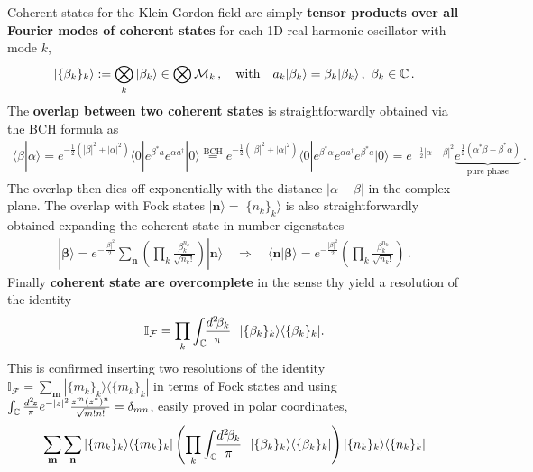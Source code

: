 \documentclass[../QFT_main.tex]{subfiles}
\begin{document}
\begin{mytheorem}
%
Coherent states for the Klein-Gordon field are simply \textbf{tensor products over all Fourier modes of coherent states} for each 1D real harmonic oscillator with mode $k$,
\begin{align}
    |\{ \beta_k \}_k \rangle := \bigotimes_{k} |\beta_k \rangle\in \bigotimes \mathcal{M}_k\,,\quad\text{with}\quad
    a_k |\beta_k \rangle = \beta_k |\beta_k \rangle\,,\,\, \beta_k\in \mathbb{C}\,.
\end{align}
The \textbf{overlap between two coherent states} is straightforwardly obtained via the BCH formula as
\begin{align}
    \langle \beta | \alpha \rangle = e^{-\frac{1}{2}(|\beta|^2 + |\alpha|^2)} \langle 0 | e^{\beta^* a} e^{\alpha a^{\dagger}} |0 \rangle \overset{\mathrm{BCH}}{=} e^{-\frac{1}{2}(|\beta|^2 + |\alpha|^2)} \langle 0 | e^{\beta^*\alpha}e^{\alpha a^\dagger} e^{\beta^* a} |0 \rangle 
    = e^{-\frac{1}{2}|\alpha-\beta|^2} \underbrace{e^{\frac{1}{2}(\alpha^*\beta-\beta^*\alpha)}}_{\text{pure phase}}\,.
\end{align}
The overlap then {dies off exponentially with the distance} $|\alpha-\beta|$ in the complex plane.
The overlap with Fock states $|\mathbf{n}\rangle = |\{n_k\}_k\rangle$ is also straightforwardly obtained expanding the coherent state in number eigenstates
\begin{align}
    |\boldsymbol{\beta} \rangle = e^{-\frac{|\beta|^2}{2}} \sum_{\mathbf{n}} \left(\prod_k\frac{\beta_k^{n_k}}{\sqrt{n_k!}}\right) |\mathbf{n}\rangle \quad \Rightarrow \quad
    \langle \mathbf{n} | \boldsymbol{\beta} \rangle = e^{-\frac{|\beta|^2}{2}} \left(\prod_k\frac{\beta_k^{n_k}}{\sqrt{n_k!}}\right)\,.
\end{align}
Finally \textbf{coherent state are overcomplete} in the sense thy yield a resolution of the identity 
\begin{align}
    \mathbb{I}_{\mathcal{F}} = \prod_k \int_{\mathbb{C}}\!\!\frac{d^2\!\beta_k}{\pi}\,\,\,\, |\{\beta_k\}_k \rangle \langle \{\beta_k\}_k |.
\end{align}
This is confirmed inserting two resolutions of the identity $\mathbb{I}_{\mathcal{F}}=\sum_{\mathbf{m}}|\{m_k\}_k \rangle \langle \{m_k\}_k |$ in terms of Fock states and using $\int_{\mathbb{C}}\frac{d^2\!z}{\pi}e^{-|z|^2}\frac{z^m (z^*)^n}{\sqrt{m! n!}} = \delta_{mn}$, easily proved in polar coordinates,
\begin{align}
    \sum_{\mathbf{m}} &\sum_{\mathbf{n}} | \{m_k\}_k \rangle \langle \{m_k\}_k | \left( \prod_{k} \int_{\C}\!\!\frac{d^2\!\beta_k}{\pi}\,\,\,\, |\{\beta_k\}_k \rangle \langle \{\beta_k\}_k | \right) | \{n_k\}_k \rangle \langle \{n_k\}_k |\\

\end{align}
\end{mytheorem}
\end{document}
